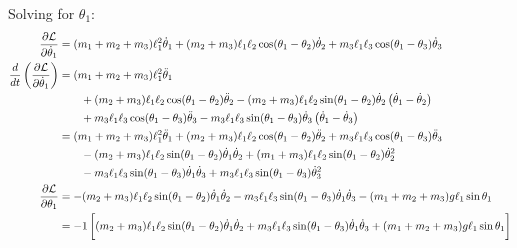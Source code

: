 \documentclass[letterpaper,8pt]{article}
\begin{document}
Solving for $\theta_1$:
\begin{align*}
\frac{\partial \mathcal{L}}{\partial \dot{\theta}_1} &= (m_1 + m_2 + m_3)\ell_1^2 \dot{\theta}_1
                                                        + (m_2 + m_3)\ell_1\ell_2 \cos(\theta_1 - \theta_2)\dot{\theta}_2
                                                        + m_3 \ell_1 \ell_3 \cos (\theta_1 - \theta_3)\dot{\theta}_3 \\
\frac{d}{dt} \left( \frac{\partial \mathcal{L}}{\partial \dot{\theta}_1} \right) &= (m_1 + m_2 + m_3)\ell_1^2 \ddot{\theta}_1 \\
  & \qquad + (m_2 + m_3)\ell_1\ell_2 \cos(\theta_1 - \theta_2)\ddot{\theta}_2 
           - (m_2 + m_3)\ell_1\ell_2 \sin(\theta_1 - \theta_2)\dot{\theta}_2\left(\dot{\theta}_1 - \dot{\theta}_2 \right) \\
  & \qquad + m_3 \ell_1 \ell_3 \cos (\theta_1 - \theta_3)\ddot{\theta}_3 
           - m_3 \ell_1 \ell_3 \sin (\theta_1 - \theta_3)\dot{\theta}_3 \left( \dot{\theta}_1 - \dot{\theta}_3 \right) \\
  &= (m_1 + m_2 + m_3)\ell_1^2 \ddot{\theta}_1 
           + (m_2 + m_3)\ell_1\ell_2 \cos(\theta_1 - \theta_2)\ddot{\theta}_2 
           + m_3 \ell_1 \ell_3 \cos (\theta_1 - \theta_3)\ddot{\theta}_3 \\
  & \qquad - (m_2 + m_3)\ell_1\ell_2 \sin(\theta_1 - \theta_2)\dot{\theta}_1\dot{\theta}_2 
           + (m_1 + m_3)\ell_1\ell_2 \sin(\theta_1 - \theta_2)\dot{\theta}_2^2 \\
  & \qquad - m_3 \ell_1 \ell_3 \sin (\theta_1 - \theta_3)\dot{\theta}_1\dot{\theta}_3 
           + m_3 \ell_1 \ell_3 \sin (\theta_1 - \theta_3)\dot{\theta}_3^2 \\
\frac{\partial \mathcal{L}}{\partial \theta_1} &= - (m_2 + m_3)\ell_1 \ell_2 \sin (\theta_1 - \theta_2) \dot{\theta}_1 \dot{\theta}_2
           - m_3 \ell_1 \ell_3 \sin (\theta_1 - \theta_3) \dot{\theta}_1\dot{\theta}_3
           - (m_1 + m_2 + m_3) g \ell_1 \sin \theta_1 \\
  &= -1 \left[ \vphantom{\frac{1}{2}} (m_2 + m_3)\ell_1 \ell_2 \sin (\theta_1 - \theta_2) \dot{\theta}_1 \dot{\theta}_2
           + m_3 \ell_1 \ell_3 \sin (\theta_1 - \theta_3) \dot{\theta}_1\dot{\theta}_3
           + (m_1 + m_2 + m_3) g \ell_1 \sin \theta_1 \right] \\
\end{align*}
\end{document}
